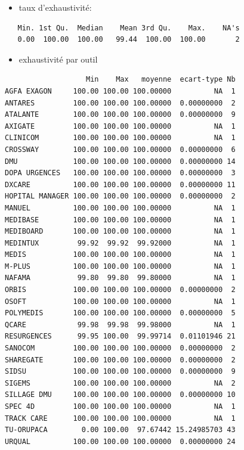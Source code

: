 \documentclass[]{article}
\begin{document}
\begin{itemize}
\itemsep1pt\parskip0pt
\item
  taux d'exhaustivité:
\end{itemize}

\begin{verbatim}
   Min. 1st Qu.  Median    Mean 3rd Qu.    Max.    NA's 
   0.00  100.00  100.00   99.44  100.00  100.00       2 
\end{verbatim}

\begin{itemize}
\itemsep1pt\parskip0pt
\item
  exhaustivité par outil
\end{itemize}

\begin{verbatim}
                   Min    Max   moyenne  ecart-type Nb
AGFA EXAGON     100.00 100.00 100.00000          NA  1
ANTARES         100.00 100.00 100.00000  0.00000000  2
ATALANTE        100.00 100.00 100.00000  0.00000000  9
AXIGATE         100.00 100.00 100.00000          NA  1
CLINICOM        100.00 100.00 100.00000          NA  1
CROSSWAY        100.00 100.00 100.00000  0.00000000  6
DMU             100.00 100.00 100.00000  0.00000000 14
DOPA URGENCES   100.00 100.00 100.00000  0.00000000  3
DXCARE          100.00 100.00 100.00000  0.00000000 11
HOPITAL MANAGER 100.00 100.00 100.00000  0.00000000  2
MANUEL          100.00 100.00 100.00000          NA  1
MEDIBASE        100.00 100.00 100.00000          NA  1
MEDIBOARD       100.00 100.00 100.00000          NA  1
MEDINTUX         99.92  99.92  99.92000          NA  1
MEDIS           100.00 100.00 100.00000          NA  1
M-PLUS          100.00 100.00 100.00000          NA  1
NAFAMA           99.80  99.80  99.80000          NA  1
ORBIS           100.00 100.00 100.00000  0.00000000  2
OSOFT           100.00 100.00 100.00000          NA  1
POLYMEDIS       100.00 100.00 100.00000  0.00000000  5
QCARE            99.98  99.98  99.98000          NA  1
RESURGENCES      99.95 100.00  99.99714  0.01101946 21
SANOCOM         100.00 100.00 100.00000  0.00000000  2
SHAREGATE       100.00 100.00 100.00000  0.00000000  2
SIDSU           100.00 100.00 100.00000  0.00000000  9
SIGEMS          100.00 100.00 100.00000          NA  2
SILLAGE DMU     100.00 100.00 100.00000  0.00000000 10
SPEC 4D         100.00 100.00 100.00000          NA  1
TRACK CARE      100.00 100.00 100.00000          NA  1
TU-ORUPACA        0.00 100.00  97.67442 15.24985703 43
URQUAL          100.00 100.00 100.00000  0.00000000 24
\end{verbatim}
\end{document}
